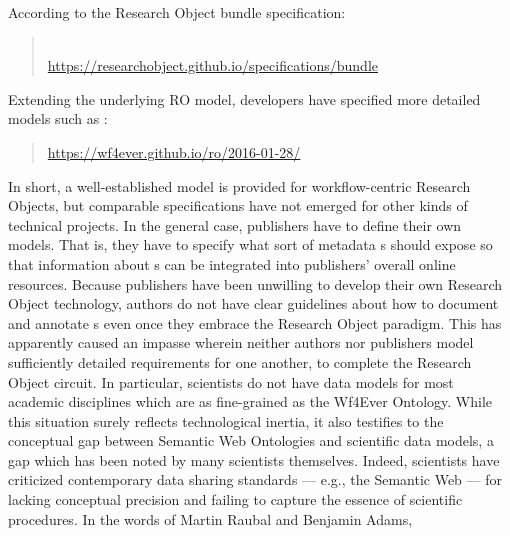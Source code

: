 \documentclass[10pt,letterpaper]{article}
\newcommand{\rpdfLink}[1]{\href{#1}{\small{#1}}}
\begin{document}
According to the Research Object bundle specification: 

\begin{quote}{}\\
\rpdfLink{https://researchobject.github.io/specifications/bundle}
\end{quote}

Extending the underlying RO model, developers have 
specified more detailed models such as :

\begin{quote}{}
\rpdfLink{https://wf4ever.github.io/ro/2016-01-28/}
\end{quote}

In short, a well-established model is provided for workflow-centric 
Research Objects, but comparable specifications have not 
emerged for other kinds of technical projects.  In the general 
case, publishers have to define their own {\RO} 
models.  That is, they have to specify what sort of 
metadata {\RO}s should expose so that 
information about {\RO}s can be integrated 
into publishers' overall online resources.  
\p{}
Because publishers have been unwilling to develop their own 
Research Object technology, authors do not have clear 
guidelines about how to document and annotate {\RO}s 
even once they embrace the Research Object paradigm.  
This has apparently caused an impasse wherein 
neither authors nor publishers model sufficiently detailed 
requirements for one another, to complete the Research Object 
circuit.  In particular, scientists do not have 
{\RO} data models for most academic disciplines 
which are as fine-grained as the Wf4Ever Ontology.  
While this situation surely reflects technological 
inertia, it also testifies to the conceptual gap between 
Semantic Web Ontologies and scientific data models, a gap 
which has been noted by many scientists themselves.  
\p{}
Indeed, scientists have criticized contemporary data sharing standards  
--- e.g., the Semantic Web --- for lacking conceptual precision 
and failing to capture the essence of scientific 
procedures.  In the words of 
Martin Raubal and Benjamin Adams,
\end{document}
